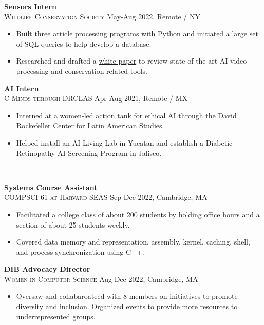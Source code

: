 \documentclass[11pt]{article}
\begin{document}
    \noindent \textbf{Sensors Intern}\\
    \textsc{{Wildlife Conservation Society}} \hfill May-Aug 2022, Remote / NY
    \begin{itemize}[itemsep=-.4em, leftmargin=1em]\vspace{-2mm}
      \item Built three article processing programs with Python and initiated a large set of SQL queries to help develop a database.
      \item Researched and drafted a 
      \href{https://bit.ly/AI-Advancing-Video-Processing-and-CTDS}{white-paper} to review state-of-the-art AI video processing and conservation-related tools.
    \end{itemize}

    \noindent \textbf{AI Intern}\\
    \textsc{{C Minds through DRCLAS}} \hfill Apr-Aug 2021, Remote / MX
    \begin{itemize}[itemsep=-.4em, leftmargin=1em]\vspace{-2mm}
      \item Interned at a women-led action tank for ethical AI through the David Rockefeller Center for Latin American Studies.
      \item Helped install an AI Living Lab in Yucatan and establish a Diabetic Retinopathy AI Screening Program in Jalisco.
    \end{itemize}

  \vspace{-7pt}\\
  \noindent\makebox[\linewidth]{\rule{7.5in}{0.3pt}}


  \noindent\textbf{Systems Course Assistant}  \\
  \textsc{COMPSCI 61 at Harvard SEAS} \hfill Sep-Dec 2022, Cambridge, MA
  \begin{itemize}[itemsep=-.4em, leftmargin=1em]\vspace{-2mm}
    \item Facilitated a college class of about 200 students by holding office hours and a section of about 25 students weekly.
    \item Covered data memory and representation, assembly, kernel, caching, shell, and process synchronization using C++.
  \end{itemize}

  \noindent\textbf{DIB Advocacy Director} \\
  \textsc{Women in Computer Science} \hfill Aug-Dec 2022, Cambridge, MA
  \begin{itemize}[itemsep=-.4em, leftmargin=1em]\vspace{-2mm}
    \item Oversaw and collabaroateed with 8 members on initiatives to promote diversity and inclusion. Organized events to provide more resources to underrepresented groups.
  \end{itemize}
\end{document}
